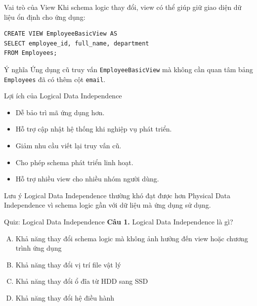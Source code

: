 \documentclass[aspectratio=169,11pt]{beamer}
\begin{document}
\begin{frame}[fragile]{Vai trò của View}
Khi schema logic thay đổi, view có thể giúp giữ giao diện dữ liệu ổn định cho ứng dụng:

\begin{lstlisting}[style=sqlstyle]
CREATE VIEW EmployeeBasicView AS
SELECT employee_id, full_name, department
FROM Employees;
\end{lstlisting}

\begin{block}{Ý nghĩa}
Ứng dụng cũ truy vấn \texttt{EmployeeBasicView} mà không cần quan tâm bảng \texttt{Employees} đã có thêm cột \texttt{email}.
\end{block}
\end{frame}

\begin{frame}{Lợi ích của Logical Data Independence}
\begin{itemize}
  \item Dễ bảo trì mã ứng dụng hơn.
  \item Hỗ trợ cập nhật hệ thống khi nghiệp vụ phát triển.
  \item Giảm nhu cầu viết lại truy vấn cũ.
  \item Cho phép schema phát triển linh hoạt.
  \item Hỗ trợ nhiều view cho nhiều nhóm người dùng.
\end{itemize}

\vspace{0.3cm}
\begin{alertblock}{Lưu ý}
Logical Data Independence thường khó đạt được hơn Physical Data Independence vì schema logic gần với dữ liệu mà ứng dụng sử dụng.
\end{alertblock}
\end{frame}

\begin{frame}{Quiz: Logical Data Independence}
\textbf{Câu 1.} Logical Data Independence là gì?
\begin{enumerate}[A.]
  \item Khả năng thay đổi schema logic mà không ảnh hưởng đến view hoặc chương trình ứng dụng
  \item Khả năng thay đổi vị trí file vật lý
  \item Khả năng thay đổi ổ đĩa từ HDD sang SSD
  \item Khả năng thay đổi hệ điều hành
\end{enumerate}
\end{frame}
\end{document}
